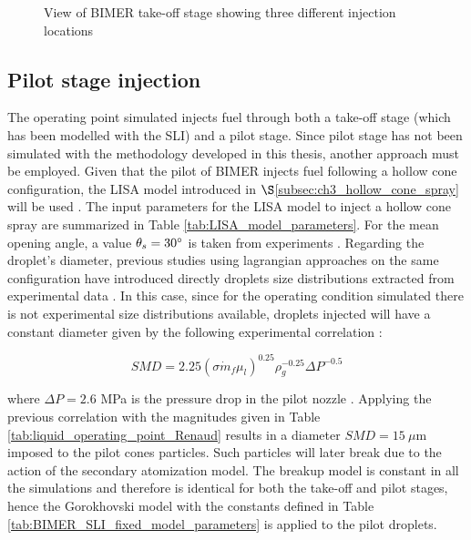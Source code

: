 \begin{figure}[h!]
	\centering	{}
	\caption{View of BIMER take-off stage showing three different injection locations}	\label{fig:BIMER_multipoint_injection_planes_view}
\end{figure}





\subsection{Pilot stage injection}

The operating point simulated injects fuel through both a take-off stage (which has been modelled with the SLI) and a pilot stage. Since pilot stage has not been simulated with the methodology developed in this thesis, another approach must be employed. Given that the pilot of BIMER injects fuel following a hollow cone configuration, the LISA model introduced in $\S$\ref{subsec:ch3_hollow_cone_spray} will be used .   The input parameters for the LISA model to inject a hollow cone spray are summarized in Table \ref{tab:LISA_model_parameters}. For the mean opening angle, a value $\theta_s = 30 \degree$ is taken from experiments . Regarding the droplet's diameter, previous studies using lagrangian approaches on the same configuration have introduced directly droplets size distributions extracted from experimental data . In this case, since for the operating condition simulated there is not experimental size distributions available, droplets injected will have a constant diameter given by the following experimental correlation :

\begin{equation}
SMD = 2.25 \left( \sigma \dot{m}_f \mu_l \right)^{0.25} \rho_g^{-0.25}  \Delta P^{-0.5}
\end{equation}

where $\Delta P = 2.6$ MPa is the pressure drop in the pilot nozzle . Applying the previous correlation with the magnitudes given in Table \ref{tab:liquid_operating_point_Renaud} results in a diameter $SMD = 15~\mu$m imposed to the pilot cones particles. Such particles will later break due to the action of the secondary atomization model. The breakup model is constant in all the simulations and therefore is identical for both the take-off and pilot stages, hence the Gorokhovski model with the constants defined in Table \ref{tab:BIMER_SLI_fixed_model_parameters} is applied to the pilot droplets. 

